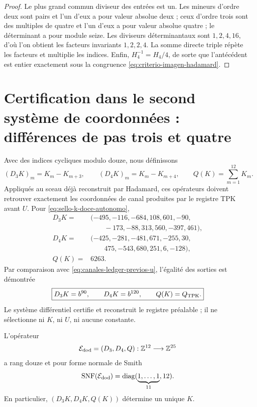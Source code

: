 \begin{proof}
Le plus grand commun diviseur des entrées est un. Les mineurs d’ordre deux sont
pairs et l’un d’eux a pour valeur absolue deux ; ceux d’ordre trois sont des multiples de
quatre et l’un d’eux a pour valeur absolue quatre ; le déterminant a pour module
seize. Les diviseurs déterminantaux sont \(1,2,4,16\), d’où l’on obtient
les facteurs invariants \(1,2,2,4\). La somme directe triple répète les
facteurs et multiplie les indices. Enfin,
\(H_4^{-1}=H_4/4\), de sorte que l’antécédent est entier exactement sous la
congruence \eqref{eq:criterio-imagen-hadamard}.
\end{proof}

\section{Certification dans le second système de coordonnées : différences de pas trois et quatre}

Avec des indices cycliques modulo douze, nous définissons
\begin{equation}
 (D_3K)_m=K_m-K_{m+3},
 \qquad
 (D_4K)_m=K_m-K_{m+4},
 \qquad
 Q(K)=\sum_{m=1}^{12}K_m.
 \label{eq:extractor-diferencias-k}
\end{equation}
Appliqués au sceau déjà reconstruit par Hadamard, ces opérateurs doivent retrouver exactement les coordonnées de canal produites par le registre TPK avant \(U\). Pour \eqref{eq:sello-k-doce-autonomo},
\begin{align*}
 D_3K={}&(-495,-116,-684,108,601,-90,\\
         &\qquad-173,-88,313,560,-397,461),\\
 D_4K={}&(-425,-281,-481,671,-255,30,\\
         &\qquad475,-543,680,251,6,-128),\\
 Q(K)={}&6263.
\end{align*}
Par comparaison avec \eqref{eq:canales-ledger-previos-u}, l'égalité des sorties est démontrée
\begin{equation}
 \boxed{
 D_3K=b^{90},\qquad D_4K=b^{120},\qquad Q(K)=Q_{\rm TPK}.}
 \label{eq:certificacion-canales-ledger-desde-k}
\end{equation}
Le système différentiel certifie et reconstruit le registre préalable ; il ne sélectionne ni \(K\), ni \(U\), ni aucune constante.

\begin{theorem}
\label{thm:completitud-extractor-transversal-k}
L'opérateur
\[
 \mathcal E_{\rm dod}=(D_3,D_4,Q):
 \mathbb Z^{12}\longrightarrow\mathbb Z^{25}
\]
a rang douze et pour forme normale de Smith
\begin{equation}
 \operatorname{SNF}(\mathcal E_{\rm dod})
 =\operatorname{diag}(\underbrace{1,\ldots,1}_{11},12).
 \label{eq:snf-extractor-transversal-k}
\end{equation}
En particulier, \((D_3K,D_4K,Q(K))\) détermine un unique \(K\).
\end{theorem}

